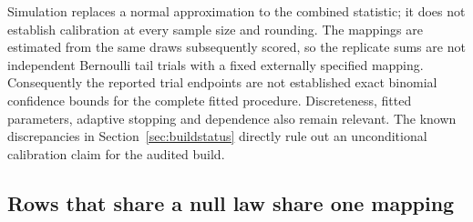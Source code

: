 \documentclass[11pt,a4paper]{article}
\begin{document}
Simulation replaces a normal approximation to the combined statistic; it does not establish calibration at every sample size and rounding. The mappings are estimated from the same draws subsequently scored, so the replicate sums are not independent Bernoulli tail trials with a fixed externally specified mapping. Consequently the reported trial endpoints are not established exact binomial confidence bounds for the complete fitted procedure. Discreteness, fitted parameters, adaptive stopping and dependence also remain relevant. The known discrepancies in Section~\ref{sec:buildstatus} directly rule out an unconditional calibration claim for the audited build.

\subsection{Rows that share a null law share one mapping}
\end{document}
